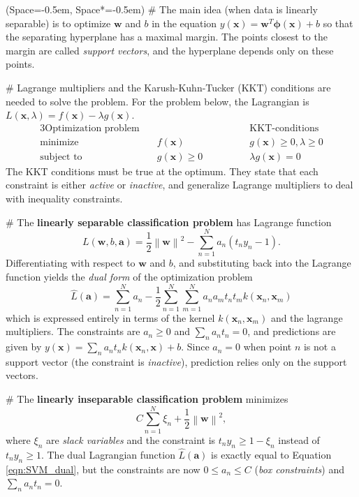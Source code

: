 \documentclass[12pt, a4paper]{article}
\newcommand{\listSpace}{-0.5em}%
\newcommand{\vect}[1]{\bm{#1}}
\newcommand{\norm}[1]{\left\lVert#1\right\rVert}
\begin{document}
\begin{easylist}[itemize]
	\ListProperties(Space=\listSpace, Space*=\listSpace)
	# The main idea (when data is linearly separable) is to optimize $\vect{w}$ and $b$ in the equation $y(\vect{x}) = \vect{w}^T \vect{\phi} (\vect{x}) + b$ so that the separating hyperplane has a maximal margin.
	The points closest to the margin are called \emph{support vectors}, and the hyperplane depends only on these points.
	
	# Lagrange multipliers and the Karush-Kuhn-Tucker (KKT) conditions are needed to solve the problem.
	For the problem below, the Lagrangian is $L(\vect{x}, \lambda) = f(\vect{x}) - \lambda g(\vect{x})$.
	\begin{alignat*}{3}
	\text{Optimization problem} & & \qquad\qquad \text{KKT-conditions}\\
		\operatorname{minimize} & \quad f(\vect{x})& \qquad\qquad g(\vect{x}) \geq 0, \lambda \geq 0 \\
		\text{subject to}  &  \quad g(\vect{x}) \geq 0 & \qquad\qquad \lambda g(\vect{x}) = 0
	\end{alignat*}
	The KKT conditions must be true at the optimum.
	They state that each constraint is either \emph{active} or \emph{inactive}, and generalize Lagrange multipliers to deal with inequality constraints.
	
	# The \textbf{linearly separable classification problem} has Lagrange function
	\begin{equation*}
		L(\vect{w}, b, \vect{a}) = \frac{1}{2} \norm{\vect{w}}^2 - \sum_{n=1}^{N} a_n \left( t_n y_n - 1 \right).
	\end{equation*}
	Differentiating with respect to $\vect{w}$ and $b$, and substituting back into the Lagrange function yields the \emph{dual form} of the optimization problem
	\begin{equation}
	\label{eqn:SVM_dual}
	\widehat{L}(\vect{a}) = \sum_{n=1}^{N} a_n -
	\frac{1}{2}
	\sum_{n=1}^{N} \sum_{m=1}^{N} a_n a_m t_n t_m k(\vect{x}_n, \vect{x}_m)
	\end{equation}
	which is expressed entirely in terms of the kernel $k(\vect{x}_n, \vect{x}_m)$ and the lagrange multipliers. 
	The constraints are $a_n \geq 0$ and $\sum_{n} a_n t_n = 0$, and predictions are given by $y(\vect{x}) = \sum_n  a_n  t_n  k(\vect{x}_n, \vect{x}) + b$.
	Since $a_n = 0$ when point $n$ is not a support vector (the constraint is \emph{inactive}), prediction relies only on the support vectors.
	
	# The \textbf{linearly inseparable classification problem} minimizes
	\begin{equation*}
	C \sum_{n=1}^{N} \xi_n + \frac{1}{2} \norm{\vect{w}}^2, 
	\end{equation*}
	where $\xi_n$ are \emph{slack variables} and the constraint is $t_n y_n \geq 1 - \xi_n$ instead of $t_n y_n \geq 1$.
	The dual Lagrangian function $\widehat{L}(\vect{a})$ is exactly equal to Equation \eqref{eqn:SVM_dual}, but the constraints are now $ 0 \leq a_n \leq C$ (\emph{box constraints}) and $\sum_{n} a_n t_n = 0$.
	

\end{easylist}
\end{document}
